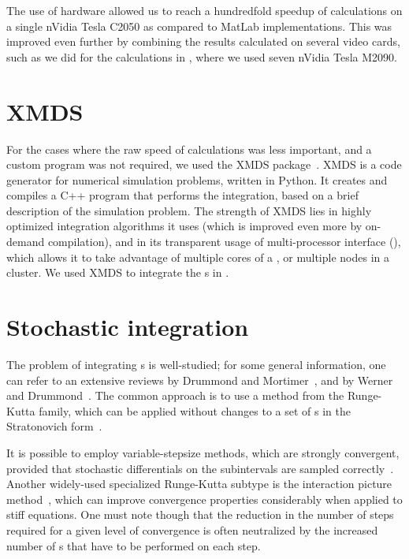 The use of  hardware allowed us to reach a hundredfold speedup of calculations on a single nVidia Tesla C2050 as compared to MatLab implementations.
This was improved even further by combining the results calculated on several video cards, such as we did for the calculations in , where we used seven nVidia Tesla M2090.


\section{XMDS}

For the cases where the raw speed of calculations was less important, and a custom  program was not required, we used the XMDS package~\cite{Collecutt2001,Dennis2013}.
XMDS is a code generator for numerical simulation problems, written in Python.
It creates and compiles a C++ program that performs the integration, based on a brief  description of the simulation problem.
The strength of XMDS lies in highly optimized integration algorithms it uses (which is improved even more by on-demand compilation), and in its transparent usage of multi-processor interface (), which allows it to take advantage of multiple cores of a , or multiple nodes in a cluster.
We used XMDS to integrate the s in .


\section{Stochastic integration}

The problem of integrating s is well-studied; for some general information, one can refer to an extensive reviews by Drummond and Mortimer~\cite{Drummond1991}, and by Werner and Drummond~\cite{Werner1997}.
The common approach is to use a method from the Runge-Kutta family, which can be applied without changes to a set of s in the Stratonovich form~\cite{Wilkie2004,Wilkie2005}.

It is possible to employ variable-stepsize methods, which are strongly convergent, provided that stochastic differentials on the subintervals are sampled correctly~\cite{Wilkie2005}.
Another widely-used specialized Runge-Kutta subtype is the  interaction picture method~\cite{CaradocDavies2000}, which can improve convergence properties considerably when applied to stiff equations.
One must note though that the reduction in the number of steps required for a given level of convergence is often neutralized by the increased number of s that have to be performed on each step.

